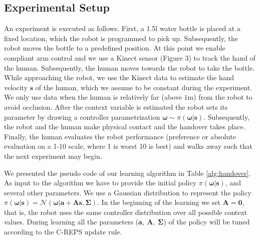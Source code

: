 \subsection{Experimental Setup}

An experiment is executed as follows. First, a 1.5l water bottle is placed at a fixed location, which the robot is programmed to pick up. Subsequently, the robot moves the bottle to a predefined position. At this point we enable compliant arm control and we use a Kinect sensor (Figure 3) to track the hand of the human. Subsequently, the human moves towards the robot to take the bottle. While approaching the robot, we use the Kinect data to estimate the hand velocity $  {\boldsymbol{s}} $ of the human, which we assume to be constant during the experiment. We only use data when the human is relatively far (above $1$m) from the robot to avoid occlusion. After the context variable is estimated the robot sets its parameter by drawing a controller parametrization $ {\boldsymbol{\omega}}  \sim \pi( {\boldsymbol{\omega}} |  {\boldsymbol{s}} )$. Subsequently, the robot and the human make physical contact and the handover takes place. Finally, the human evaluates the robot performance (preference or absolute evaluation on a 1-10 scale, where 1 is worst 10 is best) and walks away such that the next experiment may begin. 

We presented the pseudo code of our learning algorithm in Table \ref{alg:handover}. 
As input to the algorithm we have to provide the initial policy $\pi( {\boldsymbol{\omega}} |  {\boldsymbol{s}} )$, and several other parameters. We use a Gaussian distribution to represent the policy $\pi( {\boldsymbol{\omega}} |  {\boldsymbol{s}} ) = \mathcal{N}( {\boldsymbol{\omega}} |\boldsymbol{a} + \boldsymbol{A}   {\boldsymbol{s}} ,
\boldsymbol{\Sigma})$. In the beginning of the learning we set $\boldsymbol{A}=\boldsymbol{0}$, that is, the robot uses the same controller distribution over all possible context values. During learning all the parameters ($\boldsymbol{a},~ \boldsymbol{A},~ \boldsymbol{\Sigma}$) of the policy will be tuned according to the C-REPS update rule.

